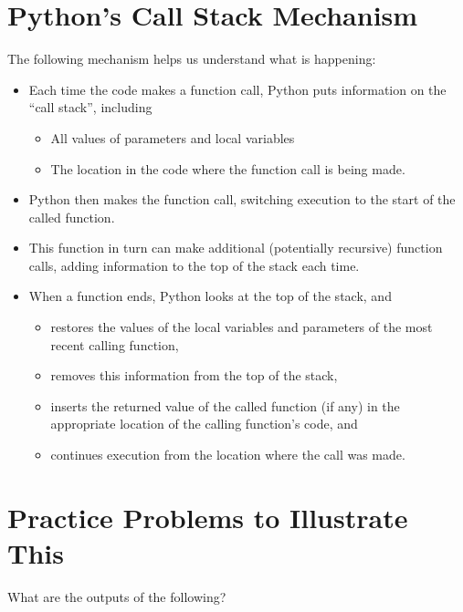 \documentclass[letterpaper,10pt,english]{sphinxmanual}
\begin{document}
\section{Python’s Call Stack Mechanism}
\label{\detokenize{lecture_notes/lec23_recursion:pythons-call-stack-mechanism}}
The following mechanism helps us understand what is happening:
\begin{itemize}
\item {} 
Each time the code makes a function call, Python puts information on
the “call stack”, including
\begin{itemize}
\item {} 
All values of parameters and local variables

\item {} 
The location in the code where the function call is being made.

\end{itemize}

\item {} 
Python then makes the function call, switching execution to the start
of the called function.

\item {} 
This function in turn can make additional (potentially recursive)
function calls, adding information to the top of the stack each time.

\item {} 
When a function ends, Python looks at the top of the stack, and
\begin{itemize}
\item {} 
restores the values of the local variables and parameters of the
most recent calling function,

\item {} 
removes this information from the top of the stack,

\item {} 
inserts the returned value of the called function (if any) in the
appropriate location of the calling function’s code, and

\item {} 
continues execution from the location where the call was made.

\end{itemize}

\end{itemize}


\section{Practice Problems to Illustrate This}
\label{\detokenize{lecture_notes/lec23_recursion:practice-problems-to-illustrate-this}}
What are the outputs of the following?
\end{document}
